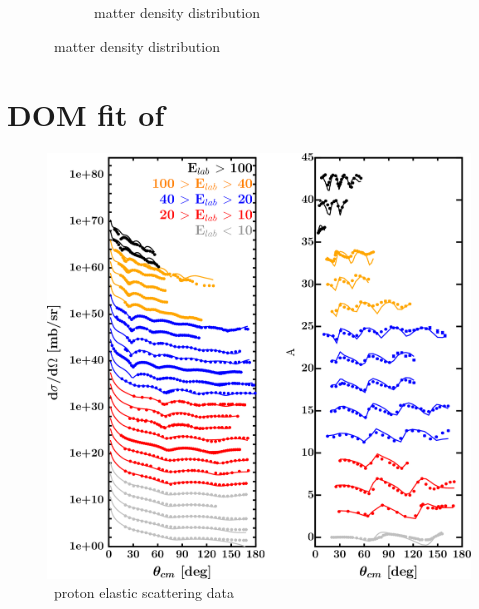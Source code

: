 \begin{figure}[hbtp]
\begin{subfigure}{0.70\textwidth}
        \caption{\caEight\ matter density distribution}
        \label{DOMFitData_ca48_matterDensity}
    \end{subfigure}
\end{figure}

\section{DOM fit of \niEight}

\label{ni58DOMOutput}
\begin{figure}[H]
    \centering
    \begin{minipage}{0.45\textwidth}
        \centering
        \includegraphics[width=1.0\textwidth]{figures/ni58_protonElastic.png}
        \caption{\niEight\ proton elastic scattering data}
        \label{DOMFitData_ni58_proton_elastic}
    \end{minipage}\hfill
    \begin{minipage}{0.45\textwidth}
        \centering

\end{minipage}
\end{figure}
